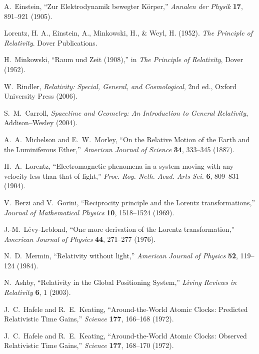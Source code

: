 \documentclass[12pt]{article}
\theoremstyle{plain} %
\begin{document}
\begin{thebibliography}{99}

A.~Einstein,
``Zur Elektrodynamik bewegter Körper,''
\emph{Annalen der Physik} \textbf{17}, 891--921 (1905).

    Lorentz, H. A., Einstein, A., Minkowski, H., \& Weyl, H. (1952). \textit{The Principle of Relativity}. Dover Publications.

H.~Minkowski,
``Raum und Zeit (1908),'' in \emph{The Principle of Relativity},
Dover (1952).

W.~Rindler,
\emph{Relativity: Special, General, and Cosmological}, 2nd ed.,
Oxford University Press (2006).

S.~M.~Carroll,
\emph{Spacetime and Geometry: An Introduction to General Relativity},
Addison–Wesley (2004).

A.~A.~Michelson and E.~W.~Morley,
``On the Relative Motion of the Earth and the Luminiferous Ether,''
\emph{American Journal of Science} \textbf{34}, 333--345 (1887).

H.~A.~Lorentz,
``Electromagnetic phenomena in a system moving with any velocity less than that of light,''
\emph{Proc. Roy. Neth. Acad. Arts Sci.} \textbf{6}, 809--831 (1904).

V.~Berzi and V.~Gorini,
``Reciprocity principle and the Lorentz transformations,''
\emph{Journal of Mathematical Physics} \textbf{10}, 1518--1524 (1969).

J.-M.~L\'evy-Leblond,
``One more derivation of the Lorentz transformation,''
\emph{American Journal of Physics} \textbf{44}, 271--277 (1976).

N.~D.~Mermin,
``Relativity without light,''
\emph{American Journal of Physics} \textbf{52}, 119--124 (1984).

N.~Ashby,
``Relativity in the Global Positioning System,''
\emph{Living Reviews in Relativity} \textbf{6}, 1 (2003).

J.~C.~Hafele and R.~E.~Keating,
``Around-the-World Atomic Clocks: Predicted Relativistic Time Gains,''
\emph{Science} \textbf{177}, 166--168 (1972).

J.~C.~Hafele and R.~E.~Keating,
``Around-the-World Atomic Clocks: Observed Relativistic Time Gains,''
\emph{Science} \textbf{177}, 168--170 (1972).


\end{thebibliography}
\end{document}

